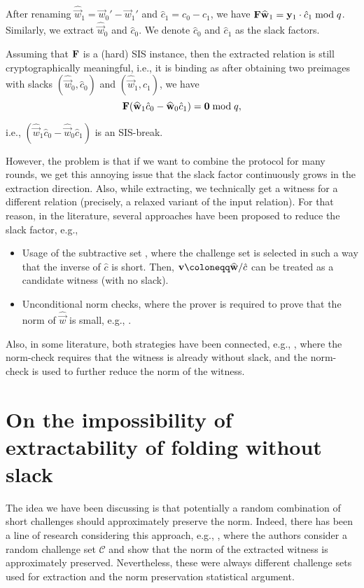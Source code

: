 After renaming $\widehat{\vec{w}}_1 = \vec{w}_0' - \vec{w}_1'$ and $\hat{c}_1 = c_0 - c_1$, we have $\mathbf{F} \widehat{{{\mathbf{w}}}}_1 = {{\mathbf{y}}}_1 \cdot \hat{c}_1 \bmod q$. Similarly, we extract $\widehat{\vec{w}}_0$ and $\hat{c}_0$. We denote $\hat{c}_0$ and $\hat{c}_1$ as the slack factors.

Assuming that $\mathbf{F}$ is a (hard) SIS instance, then the extracted relation is still cryptographically meaningful, i.e., it is binding as after obtaining two preimages with slacks $(\widehat{\vec{w}}_0, \hat{c}_0)$ and $(\widehat{\vec{w}}_1, \hat{c}_1)$, we have 
\[ 
    \mathbf{F} (\widehat{{{\mathbf{w}}}}_1 \hat{c}_0 - \widehat{{{\mathbf{w}}}}_0 \hat{c}_1) = {{\mathbf{0}}} \bmod q,
\] 

i.e., $(\widehat{\vec{w}}_1 \hat{c}_0 - \widehat{\vec{w}}_0 \hat{c}_1)$ is an SIS-break.

However, the problem is that if we want to combine the protocol for many rounds, we get this annoying issue that the slack factor continuously grows in the extraction direction. Also, while extracting, we technically get a witness for a different relation (precisely, a relaxed variant of the input relation). For that reason, in the literature, several approaches have been proposed to reduce the slack factor, e.g.,

\begin{itemize}
    \item Usage of the subtractive set \cite{C:AlbLai21,C:CinLaiMal23,EPRINT:BonChe24}, where the challenge set is selected in such a way that the inverse of $\hat{c}$ is short. Then, $\vec{v} \defeq \widehat{\vec{w}} / \hat{c}$ can be treated as a candidate witness (with no slack).
    \item Unconditional norm checks, where the prover is required to prove that the norm of $\widehat{\vec{w}}$ is small, e.g., \cite{RR,EPRINT:BonChe25}. 
\end{itemize}

Also, in some literature, both strategies have been connected, e.g., \cite{AC:KLNO24,CC}, where the norm-check requires that the witness is already without slack, and the norm-check is used to further reduce the norm of the witness. 


\section{On the impossibility of extractability of folding without slack}

The idea we have been discussing is that potentially a random combination of short challenges should approximately preserve the norm. Indeed, there has been a line of research considering this approach, e.g., \cite{EC:GenHalLyu22,C:BeuSei23}, where the authors consider a random challenge set $\mathcal{C}$ and show that the norm of the extracted witness is approximately preserved. Nevertheless, these were always different challenge sets used for extraction and the norm preservation statistical argument. 

